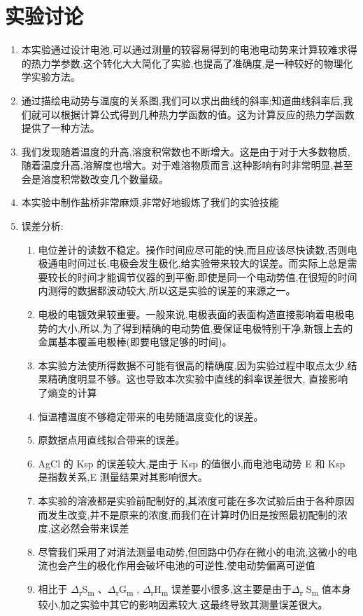 \documentclass[11pt]{report}
\begin{document}
\section{实验讨论}
\label{sec:orgd73435c}
\begin{enumerate}
\item 本实验通过设计电池,可以通过测量的较容易得到的电池电动势来计算较难求得的热力学参数,这个转化大大简化了实验,也提高了准确度,是一种较好的物理化学实验方法。
\item 通过描绘电动势与温度的关系图,我们可以求出曲线的斜率;知道曲线斜率后,我们就可以根据计算公式得到几种热力学函数的值。这为计算反应的热力学函数提供了一种方法。
\item 我们发现随着温度的升高,溶度积常数也不断增大。这是由于对于大多数物质,随着温度升高,溶解度也增大。对于难溶物质而言,这种影响有时非常明显,甚至会是溶度积常数改变几个数量级。
\item 本实验中制作盐桥非常麻烦,非常好地锻炼了我们的实验技能
\item 误差分析:
\begin{enumerate}
\item 电位差计的读数不稳定。操作时间应尽可能的快,而且应该尽快读数,否则电极通电时间过长,电极会发生极化,给实验带来较大的误差。而实际上总是需要较长的时间才能调节仪器的到平衡,即使是同一个电动势值,在很短的时间内测得的数据都波动较大,所以这是实验的误差的来源之一。
\item 电极的电镀效果较重要。一般来说,电极表面的表面构造直接影响着电极电势的大小,所以,为了得到精确的电动势值,要保证电极特别干净,新镀上去的金属基本覆盖电极棒(即要电镀足够的时间)。
\item 本实验方法使所得数据不可能有很高的精确度,因为实验过程中取点太少,结果精确度明显不够。这也导致本次实验中直线的斜率误差很大, 直接影响了熵变的计算
\item 恒温槽温度不够稳定带来的电势随温度变化的误差。
\item 原数据点用直线拟合带来的误差。
\item AgCl 的 Ksp 的误差较大,是由于 Ksp 的值很小,而电池电动势 E 和 Ksp 是指数关系,E 测量结果对其影响很大。
\item 本实验的溶液都是实验前配制好的,其浓度可能在多次试验后由于各种原因而发生改变,并不是原来的浓度,而我们在计算时仍旧是按照最初配制的浓度,这必然会带来误差
\item 尽管我们采用了对消法测量电动势,但回路中仍存在微小的电流,这微小的电流也会产生的极化作用会破坏电池的可逆性,使电动势偏离可逆值
\item 相比于 \(\Delta\)\textsubscript{r}S\textsubscript{m} 、\(\Delta\)\textsubscript{r}G\textsubscript{m} , \(\Delta\)\textsubscript{r}H\textsubscript{m} 误差要小很多,这主要是由于\(\Delta\)\textsubscript{r} S\textsubscript{m} 值本身较小,加之实验中其它的影响因素较大,这最终导致其测量误差很大。
\end{enumerate}
\end{enumerate}
\end{document}
